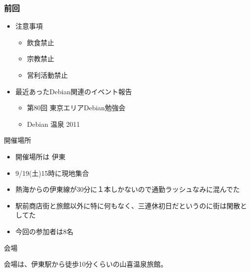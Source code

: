 \begin{frame}
 \frametitle{前回}
\begin{minipage}[t]{0.45\hsize}
  \begin{itemize}
  \item 注意事項
	\begin{itemize}
	 \item 飲食禁止
	 \item 宗教禁止
	 \item 営利活動禁止
	\end{itemize}
  \end{itemize}
\end{minipage}
\begin{minipage}[t]{0.45\hsize}
 \begin{itemize}
  \item 最近あったDebian関連のイベント報告
    \begin{itemize}
    \item 第80回 東京エリアDebian勉強会
    \item Debian 温泉 2011
    \end{itemize}
 \end{itemize}
\end{minipage}
\end{frame}




\begin{frame}{開催場所}
\begin{minipage}{0.6\hsize}
\begin{itemize}
\item 開催場所は 伊東
\item 9/19(土)15時に現地集合
\item 熱海からの伊東線が30分に１本しかないので通勤ラッシュなみに混んでた
\item 駅前商店街と旅館以外に特に何もなく、三連休初日だというのに街は閑散としてた
\item 今回の参加者は8名
\end{itemize}
\end{minipage}
\begin{minipage}{0.35\hsize}
\end{minipage}
\end{frame}

\begin{frame}{会場}

会場は、伊東駅から徒歩10分くらいの山喜温泉旅館。
\begin{center}
\end{center}
\end{frame}

